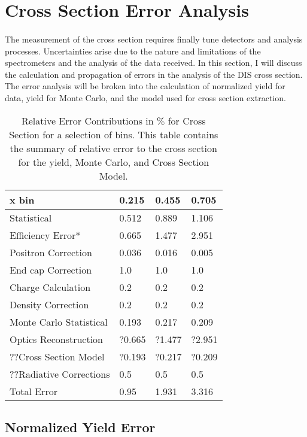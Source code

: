 \section{Cross Section Error Analysis}
\paragraph{}The measurement of the cross section requires finally tune detectors and analysis processes. Uncertainties arise due to the nature and limitations of the spectrometers and the analysis of the data received. In this section, I will discuss the calculation and propagation of errors in the analysis of the DIS cross section. The error analysis will be broken into the calculation of normalized yield for data, yield for Monte Carlo, and the model used for cross section extraction. 

\begin{table}[]
	\caption{Relative Error Contributions in $\%$ for Cross Section for a selection of bins. This table contains the summary of relative error to the cross section for the yield, Monte Carlo, and Cross Section Model.}
	\centering
	\begin{tabular}{|l|l|l|l|}
		\hline
		\textbf{\qquad \qquad\qquad x bin}   & \textbf{0.215} & \textbf{0.455} & \textbf{0.705} \\ \hline\hline
		Statistical             & 0.512 & 0.889 & 1.106 \\ \hline
		Efficiency Error*       & 0.665 & 1.477 & 2.951 \\ \hline
		Positron Correction     & 0.036 & 0.016 & 0.005 \\ \hline
		End cap Correction     & 1.0 & 1.0 & 1.0 \\ \hline
		Charge Calculation     & 0.2 & 0.2 & 0.2 \\ \hline
		Density Correction      & 0.2 & 0.2 & 0.2 \\ \hline
		Monte Carlo Statistical & 0.193 & 0.217 & 0.209 \\ \hline
		Optics Reconstruction	& ?0.665& ?1.477 &?2.951 \\ \hline
		??Cross Section Model 	& ?0.193 & ?0.217 & ?0.209 \\ \hline
		??Radiative Corrections\cite{primer} 	& 0.5  & 0.5 & 0.5 \\ \hline
		Total Error		 	 	& 0.95  & 1.931 & 3.316 \\ \hline
	\end{tabular}
\end{table}
\subsection{Normalized Yield Error}
